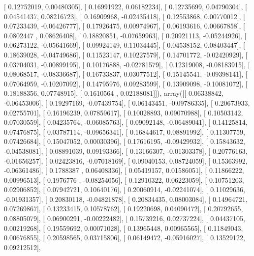\documentclass{article}
\begin{document}
       [ 0.12752019,  0.00480305],
       [ 0.16991922,  0.06182234],
       [ 0.12735699,  0.04790304],
       [ 0.04541437,  0.08216723],
       [ 0.16909968, -0.02435418],
       [ 0.12553868,  0.00770012],
       [ 0.07233439, -0.06426777],
       [ 0.17926475,  0.00974967],
       [ 0.06193616,  0.00667858],
       [ 0.0802447 ,  0.08626408],
       [ 0.18820851, -0.07659963],
       [ 0.20921113, -0.05244926],
       [ 0.06273122, -0.05641669],
       [ 0.09924149,  0.11034445],
       [ 0.04538152,  0.08403447],
       [ 0.18639028, -0.04749686],
       [ 0.11523147,  0.10227579],
       [ 0.14701772, -0.02420929],
       [ 0.03704031, -0.00899195],
       [ 0.10176888, -0.02781579],
       [ 0.12319008, -0.08183915],
       [ 0.08068517, -0.08336687],
       [ 0.16733837,  0.03077512],
       [ 0.15145541, -0.09398141],
       [ 0.07064959, -0.10207092],
       [ 0.14795976,  0.09283599],
       [ 0.13909098, -0.10081072],
       [ 0.18188356,  0.07748915],
       [ 0.1610564 ,  0.02188081]]), array([[ 0.06338842, -0.06453006],
       [ 0.19297169, -0.07439754],
       [ 0.06143451, -0.09786335],
       [ 0.20673933,  0.02755701],
       [ 0.16196239,  0.07859617],
       [ 0.10028893,  0.09070988],
       [ 0.10503142,  0.07030559],
       [ 0.04235764, -0.06085763],
       [ 0.09092148, -0.06489041],
       [ 0.14125814,  0.07476875],
       [ 0.03787114, -0.09656341],
       [ 0.16844617,  0.08891992],
       [ 0.11307759,  0.07426684],
       [ 0.15047052,  0.00030396],
       [ 0.17616195, -0.09429932],
       [ 0.15843632, -0.04538081],
       [ 0.08891039,  0.09193366],
       [ 0.13166307, -0.01303378],
       [ 0.20776163, -0.01656257],
       [ 0.02423816, -0.07018169],
       [ 0.09040153,  0.08724059],
       [ 0.15363992, -0.06361486],
       [ 0.1788387 ,  0.06408336],
       [ 0.05419157,  0.01586051],
       [ 0.11866222,  0.00996513],
       [ 0.1976776 , -0.08254056],
       [ 0.12910322,  0.06223059],
       [ 0.10751203,  0.02906852],
       [ 0.07942721,  0.10640176],
       [ 0.20060914, -0.02241074],
       [ 0.11029636, -0.01931357],
       [ 0.20830118, -0.04821878],
       [ 0.20834435,  0.08003084],
       [ 0.14964721,  0.07269867],
       [ 0.13233415,  0.10578762],
       [ 0.19220698,  0.04090472],
       [ 0.20792655,  0.08805079],
       [ 0.06900291, -0.00222482],
       [ 0.15739216,  0.02737224],
       [ 0.04437105,  0.00219268],
       [ 0.19559692,  0.00071028],
       [ 0.13965448,  0.00965565],
       [ 0.11849043,  0.00676855],
       [ 0.20598565,  0.03715806],
       [ 0.06149472, -0.05916027],
       [ 0.13529122,  0.09212512],
\end{document}
